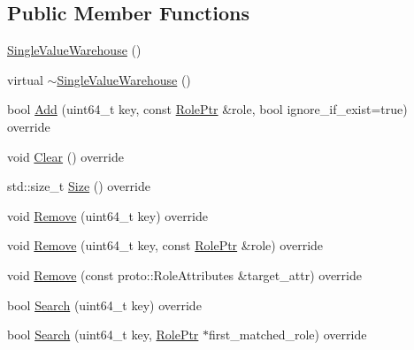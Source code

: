 \subsection*{Public Member Functions}
\begin{DoxyCompactItemize}
\item 
\hyperlink{classapollo_1_1cyber_1_1service__discovery_1_1SingleValueWarehouse_ae3ae74dcabfb7427e089480ffe57f84e}{Single\-Value\-Warehouse} ()
\item 
virtual \hyperlink{classapollo_1_1cyber_1_1service__discovery_1_1SingleValueWarehouse_a389e84c216578eb4503e4f3ec8c6b469}{$\sim$\-Single\-Value\-Warehouse} ()
\item 
bool \hyperlink{classapollo_1_1cyber_1_1service__discovery_1_1SingleValueWarehouse_afec546e114133082e13dda05c040447b}{Add} (uint64\-\_\-t key, const \hyperlink{namespaceapollo_1_1cyber_1_1service__discovery_a47c65bbb4b41d9ae41bfbd33271df525}{Role\-Ptr} \&role, bool ignore\-\_\-if\-\_\-exist=true) override
\item 
void \hyperlink{classapollo_1_1cyber_1_1service__discovery_1_1SingleValueWarehouse_a09278f64fb0a16e6315f74ec407d1b0e}{Clear} () override
\item 
std\-::size\-\_\-t \hyperlink{classapollo_1_1cyber_1_1service__discovery_1_1SingleValueWarehouse_a33c78ad0e9aee8e0c5e11e271c079eb2}{Size} () override
\item 
void \hyperlink{classapollo_1_1cyber_1_1service__discovery_1_1SingleValueWarehouse_a9691aef4817195f6fbd32682d5990c77}{Remove} (uint64\-\_\-t key) override
\item 
void \hyperlink{classapollo_1_1cyber_1_1service__discovery_1_1SingleValueWarehouse_a9be92d02e322eb3aff6db337fbb0274b}{Remove} (uint64\-\_\-t key, const \hyperlink{namespaceapollo_1_1cyber_1_1service__discovery_a47c65bbb4b41d9ae41bfbd33271df525}{Role\-Ptr} \&role) override
\item 
void \hyperlink{classapollo_1_1cyber_1_1service__discovery_1_1SingleValueWarehouse_ac2ee49a7ba684e70ca9f4842bf2f4bbe}{Remove} (const proto\-::\-Role\-Attributes \&target\-\_\-attr) override
\item 
bool \hyperlink{classapollo_1_1cyber_1_1service__discovery_1_1SingleValueWarehouse_a9b36459c93686baa989bee324bf4778a}{Search} (uint64\-\_\-t key) override
\item 
bool \hyperlink{classapollo_1_1cyber_1_1service__discovery_1_1SingleValueWarehouse_ac351bd21db6f37d7460d7585ce19e131}{Search} (uint64\-\_\-t key, \hyperlink{namespaceapollo_1_1cyber_1_1service__discovery_a47c65bbb4b41d9ae41bfbd33271df525}{Role\-Ptr} $\ast$first\-\_\-matched\-\_\-role) override

\end{DoxyCompactItemize}

